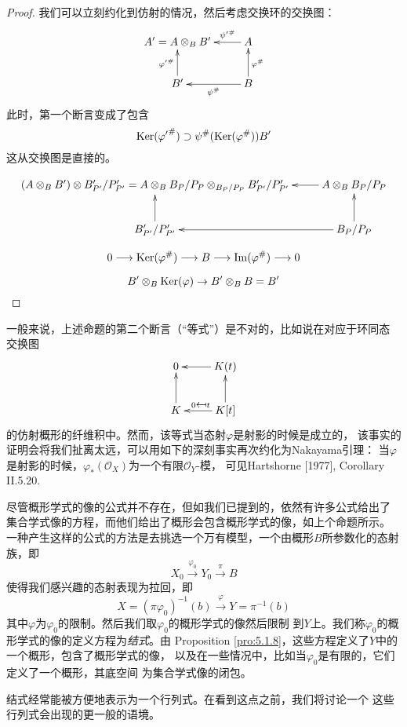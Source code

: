 \begin{proof}
我们可以立刻约化到仿射的情况，然后考虑交换环的交换图：
\[
    \xymatrix{
        A'=A\otimes_B B'&A\ar[l]_-{{\psi'}^\#}\\
        B'\ar[u]^{{\varphi'}^\#}&B\ar[l]^-{\psi^\#}\ar[u]_{\varphi^\#}
    }
\]
此时，第一个断言变成了包含
\[
    \operatorname{Ker}({\varphi'}^\#) \supset \psi^{\#}(\operatorname{Ker}(\varphi^{\#})) B'
\]
这从交换图是直接的。


\[
    \xymatrix{
        (A \otimes_B B') \otimes B_{P'}' / P_{P'}'=A \otimes_B B_P / P_P \otimes_{B_P / P_P} B_{P'}' / P_{P'}'&A \otimes_B B_P / P_P\ar[l]\\
        B_{P'}' / P_{P'}'\ar[u]&B_P / P_P\ar[l]\ar[u]
    }
\]

\[
    0 \longrightarrow \operatorname{Ker}(\varphi^{\#}) \longrightarrow B \longrightarrow \operatorname{Im}(\varphi^{\#}) \longrightarrow 0
\]

\[
    B' \otimes_B \operatorname{Ker}(\varphi) \rightarrow B' \otimes_B B=B'
\]

\nottran
\end{proof}

一般来说，上述命题的第二个断言（“等式”）是不对的，比如说在对应于环同态
交换图
\[
    \xymatrix{
        0 & K(t)\ar[l]\\
        K\ar[u]&K[t]\ar[l]_{0 \mapsfrom t}\ar[u]
    }
\]
的仿射概形的纤维积中。然而，该等式当态射$\varphi$是射影的时候是成立的，
该事实的证明会将我们扯离太远，可以用如下的深刻事实再次约化为Nakayama引理：
当$\varphi$是射影的时候，$\varphi_*(\mathscr O_X)$为一个有限$\mathscr O_Y$-模，
可见Hartshorne [1977], Corollary II.5.20.


尽管概形学式的像的公式并不存在，但如我们已提到的，依然有许多公式给出了
集合学式像的方程，而他们给出了概形会包含概形学式的像，如上个命题所示。
一种产生这样的公式的方法是去挑选一个万有模型，一个由概形$B$所参数化的态射族，即
\[
    X_0 \stackrel{\varphi_0}{\longrightarrow} Y_0 \stackrel{\pi}{\longrightarrow} B
\]
使得我们感兴趣的态射表现为拉回，即
\[
    X=(\pi \varphi_0)^{-1}(b) \stackrel{\varphi}{\longrightarrow} Y=\pi^{-1}(b)
\]
其中$\varphi$为$\varphi_0$的限制。然后我们取$\varphi_0$的概形学式的像然后限制
到$Y$上。我们称$\varphi_0$的概形学式的像的定义方程为\textit{结式}。由
Proposition \ref{pro:5.1.8}，这些方程定义了$Y$中的一个概形，包含了概形学式的像，
以及在一些情况中，比如当$\varphi_0$是有限的，它们定义了一个概形，其底空间
为集合学式像的闭包。

结式经常能被方便地表示为一个行列式。在看到这点之前，我们将讨论一个
这些行列式会出现的更一般的语境。

